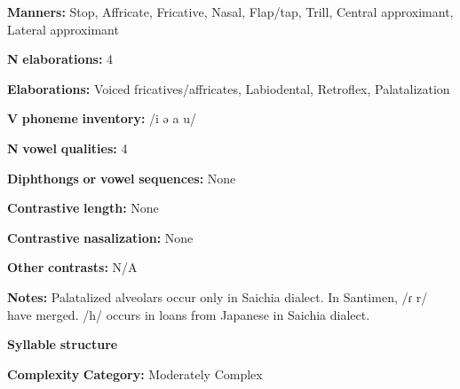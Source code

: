\documentclass[output=paper]{langsci/langscibook}
\begin{document}
\begin{styleBody}
\textbf{Manners:} Stop, Affricate, Fricative, Nasal, Flap/tap, Trill, Central approximant, Lateral approximant
\end{styleBody}

\begin{styleBody}
\textbf{N} \textbf{elaborations:} 4
\end{styleBody}

\begin{styleBody}
\textbf{Elaborations:} Voiced fricatives/affricates, Labiodental, Retroflex, Palatalization
\end{styleBody}

\begin{styleBody}
\textbf{V} \textbf{phoneme} \textbf{inventory:} /i ə a u/
\end{styleBody}

\begin{styleBody}
\textbf{N} \textbf{vowel} \textbf{qualities:} 4
\end{styleBody}

\begin{styleBody}
\textbf{Diphthongs} \textbf{or} \textbf{vowel} \textbf{sequences:} None
\end{styleBody}

\begin{styleBody}
\textbf{Contrastive} \textbf{length:} None
\end{styleBody}

\begin{styleBody}
\textbf{Contrastive} \textbf{nasalization:} None
\end{styleBody}

\begin{styleBody}
\textbf{Other} \textbf{contrasts:} N/A
\end{styleBody}

\begin{styleBody}
\textbf{Notes:} Palatalized alveolars occur only in Saichia dialect. In Santimen, /ɾ r/ have merged. /h/ occurs in loans from Japanese in Saichia dialect.
\end{styleBody}

\begin{styleBody}
\textbf{Syllable} \textbf{structure}
\end{styleBody}

\begin{styleBody}
\textbf{Complexity} \textbf{Category:} Moderately Complex
\end{styleBody}
\end{document}
